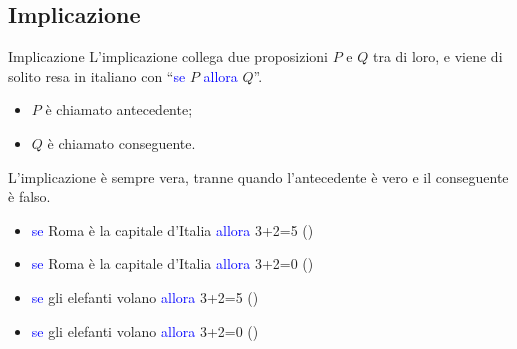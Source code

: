 \documentclass[aspectratio=169,10pt]{beamer}
\newcommand{\xmark}{{\color{red}{\ding{55}}}}
\newcommand{\conn}[1]{\textcolor{blue}{#1}}
\begin{document}
\subsection{Implicazione}

\begin{frame}{Implicazione}
    L'\alert{implicazione} collega due proposizioni $P$ e $Q$ tra di loro, e viene di solito resa in italiano con  ``\conn{se} $P$ \conn{allora} $Q$''.    \begin{itemize}
        \item $P$ è chiamato \alert{antecedente};
        \item $Q$ è chiamato \alert{conseguente}.
    \end{itemize}
    L'implicazione è sempre vera, tranne quando l'antecedente è vero e il conseguente è falso.
    \begin{example}
        \begin{itemize}
            \item \conn{se} Roma è la capitale d'Italia \conn{allora} 3+2=5 \pause (\checkmark)
            \pause
            \item \conn{se} Roma è la capitale d'Italia \conn{allora} 3+2=0 \pause (\xmark)
            \pause
            \item \conn{se} gli elefanti volano \conn{allora} 3+2=5 \pause (\checkmark)
            \pause
            \item \conn{se} gli elefanti volano \conn{allora} 3+2=0 \pause (\checkmark)
        \end{itemize}
    \end{example}
\end{frame}
\end{document}
